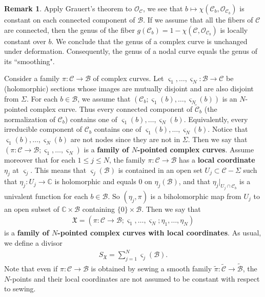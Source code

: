 \documentclass[12pt,b5paper,notitlepage]{report}
\theoremstyle{definition}
\newtheorem{rem}[df]{Remark}
\theoremstyle{plain}
\newcommand{\fk}{\mathfrak}
\newcommand{\mc}{\mathcal}
\newcommand{\wtd}{\widetilde}
\newcommand{\scr}{\mathscr}
\newcommand{\sgm}{\varsigma}
\newcommand{\SX}{S_{\fk X}}
\newcommand{\mbb}{\mathbb}
\newcommand{\Cbb}{\mathbb C}
\newcommand{\Zbb}{\mathbb Z}
\numberwithin{equation}{section}
\begin{document}
\begin{rem}\label{lb124}
Apply Grauert's theorem to $\scr O_{\mc C}$, we see that $b\mapsto\chi(\mc C_b,\scr O_{\mc C_b})$ is constant on each connected component of $\mc B$. If we assume that all the fibers of $\mc C$ are  connected, then the genus of the fiber $g(\mc C_b)=1-\chi(\mc C,\scr O_{\mc C_b})$ is locally constant over $b$. We conclude that the genus of a complex curve is unchanged under deformation. Consequently, the genus of a nodal curve equals the genus of its ``smoothing". 
\end{rem}

Consider a family $\pi:\mc C\rightarrow\mc B$ of complex curves. Let $\sgm_1,\dots,\sgm_N:\mc B\rightarrow\mc C$ be (holomorphic) sections whose images are mutually disjoint and are also disjoint from $\Sigma$. For each $b\in\mc B$, we assume that $(\mc C_b;\sgm_1(b),\dots,\sgm_N(b))$ is an $N$-pointed complex curve. Thus every connected component of $\wtd{\mc C}_b$ (the normalization  of $\mc C_b$) contains one of $\sgm_1(b),\dots,\sgm_N(b)$. Equivalently, every irreducible component of $\mc C_b$ contains one of $\sgm_1(b),\dots,\sgm_N(b)$. Notice that  $\sgm_1(b),\dots,\sgm_N(b)$ are not nodes since they are not in $\Sigma$. Then we say that $(\pi:\mc C\rightarrow\mc B;\sgm_1,\dots,\sgm_N)$ is a \textbf{family of $N$-pointed complex curves}. Assume moreover that for each $1\leq j\leq N$, the family $\pi:\mc C\rightarrow\mc B$ has a \textbf{local coordinate} $\eta_j$ at $\sgm_j$. This means that $\sgm_j(\mc B)$ is contained in an open set $U_j\subset\mc C-\Sigma$ such that $\eta_j:U_j\rightarrow\Cbb$ is holomorphic and equals $0$ on $\eta_j(\mc B)$,  and that $\eta_j|_{U_j\cap\mc C_b}$ is a univalent function  for each $b\in\mc B$. So $(\eta_j,\pi)$ is a biholomorphic map from $U_j$ to an open subset of $\mbb C\times\mc B$ containing $\{0\}\times\mc B$. Then we say that 
\begin{align*}
\fk X=(\pi:\mc C\rightarrow\mc B;\sgm_1,\dots,\sgm_N;\eta_1,\dots,\eta_N)
\end{align*}
is a \textbf{family of $N$-pointed complex curves with local coordinates}. As usual, we define a divisor
\begin{align*}
\SX=\sum_{j=1}^N\sgm_j(\mc B).
\end{align*}
Note that even if $\pi:\mc C\rightarrow\mc B$ is obtained by sewing a smooth family $\wtd{\pi}:\wtd{\mc C}\rightarrow\wtd{\mc B}$, the $N$-points and their local coordinates are not assumed to be constant with respect to sewing.
\end{document}
